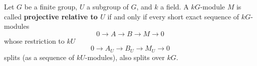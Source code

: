 Let $G$ be a finite group, $U$ a subgroup of $G$, and $k$ a field. A $kG$-module $M$ is called \textbf{projective relative to $U$} if and only if every short exact sequence of $kG$-modules
$$0 \to A \to B \to M \to 0$$
whose restriction to $kU$
$$0 \to A_U \to B_U \to M_U \to 0$$
splits (as a sequence of $kU$-modules), also splits over $kG$.
